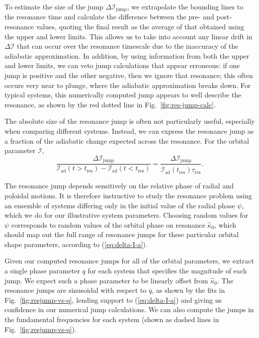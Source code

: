\documentclass[aps,prd,amsfonts,amssymb,amsmath,nofootinbib,showpacs,superscriptaddress,twocolumn]{revtex4}
\newcommand{\eqnref}[1]{(\ref{eq:#1})}
\newcommand{\figref}[1]{Fig.\ \ref{fig:#1}}
\begin{document}
To estimate the size of the jump $\Delta \mathcal{I}_{\mathrm{jump}}$, we extrapolate the bounding lines to the resonance time and calculate the difference between the pre- and post-resonance values, quoting the final result as the average of that obtained using the upper and lower limits. This allows us to take into account any linear drift in $\Delta \mathcal{I}$ that can occur over the resonance timescale due to the inaccuracy of the adiabatic approximation. In addition, by using information from both the upper and lower limits, we can veto jump calculations that appear erroneous: if one jump is positive and the other negative, then we ignore that resonance; this often occurs very near to plunge, where the adiabatic approximation breaks down. For typical systems, this numerically computed jump appears to well describe the resonance, as shown by the red dotted line in \figref{res-jump-calc}.

The absolute size of the resonance jump is often not particularly useful, especially when comparing different systems. Instead, we can express the resonance jump as a fraction of the adiabatic change expected across the resonance. For the orbital parameter $\mathcal{I}$,
\begin{equation}
\label{eq:res-jump-ratio}
\frac{\Delta \mathcal{I}_\mathrm{jump}}{\mathcal{I}_\mathrm{ad}(t>t_\mathrm{res})-\mathcal{I}_\mathrm{ad}(t<t_\mathrm{res})} = \frac{\Delta \mathcal{I}_\mathrm{jump}}{\dot{\mathcal{I}}_\mathrm{ad}(t_\mathrm{res})\tau_\mathrm{res}}.
\end{equation}

The resonance jump depends sensitively on the relative phase of radial and poloidal motions. It is therefore instructive to study the resonance problem using an ensemble of systems differing only in the initial value of the radial phase $\psi$, which we do for our illustrative system parameters. Choosing random values for $\psi$ corresponds to random values of the orbital phase on resonance $\widehat{\kappa}_0$, which should map out the full range of resonance jumps for these particular orbital shape parameters, according to \eqnref{delta-I-a}.

Given our computed resonance jumps for all of the orbital parameters, we extract a single phase parameter $q$ for each system that specifies the magnitude of each jump. We expect such a phase parameter to be linearly offset from $\widehat{\kappa}_0$. The resonance jumps are sinusoidal with respect to $q$, as shown by the fits in \figref{resjump-vs-q}, lending support to \eqnref{delta-I-a} and giving us confidence in our numerical jump calculations. We can also compute the jumps in the fundamental frequencies for each system (shown as dashed lines in \figref{resjump-vs-q}).
\end{document}
